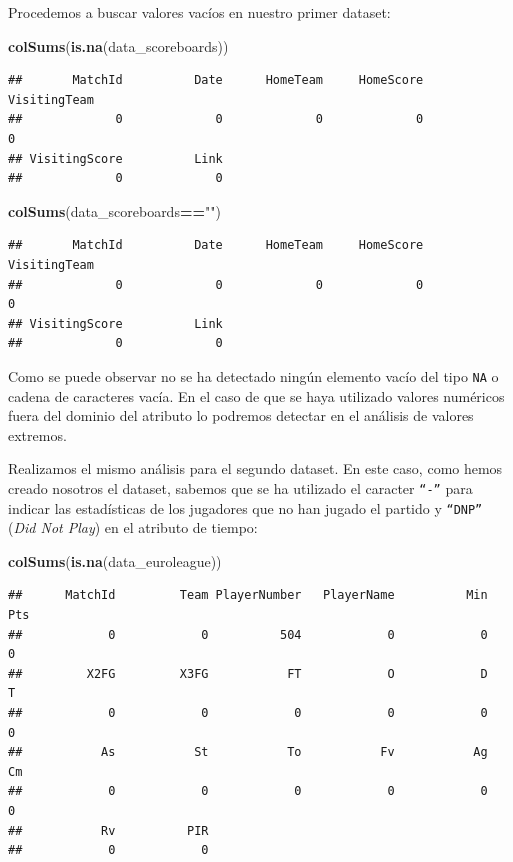 \documentclass[
]{article}
\newenvironment{Shaded}{\begin{snugshade}}{\end{snugshade}}
\newcommand{\KeywordTok}[1]{\textcolor[rgb]{0.13,0.29,0.53}{\textbf{#1}}}
\newcommand{\NormalTok}[1]{#1}
\newcommand{\OperatorTok}[1]{\textcolor[rgb]{0.81,0.36,0.00}{\textbf{#1}}}
\newcommand{\StringTok}[1]{\textcolor[rgb]{0.31,0.60,0.02}{#1}}
\begin{document}
Procedemos a buscar valores vacíos en nuestro primer dataset:

\begin{Shaded}
\begin{Highlighting}[]
\KeywordTok{colSums}\NormalTok{(}\KeywordTok{is.na}\NormalTok{(data_scoreboards))}
\end{Highlighting}
\end{Shaded}

\begin{verbatim}
##       MatchId          Date      HomeTeam     HomeScore  VisitingTeam 
##             0             0             0             0             0 
## VisitingScore          Link 
##             0             0
\end{verbatim}

\begin{Shaded}
\begin{Highlighting}[]
\KeywordTok{colSums}\NormalTok{(data_scoreboards}\OperatorTok{==}\StringTok{""}\NormalTok{)}
\end{Highlighting}
\end{Shaded}

\begin{verbatim}
##       MatchId          Date      HomeTeam     HomeScore  VisitingTeam 
##             0             0             0             0             0 
## VisitingScore          Link 
##             0             0
\end{verbatim}

Como se puede observar no se ha detectado ningún elemento vacío del tipo
\texttt{NA} o cadena de caracteres vacía. En el caso de que se haya
utilizado valores numéricos fuera del dominio del atributo lo podremos
detectar en el análisis de valores extremos.

\newpage

Realizamos el mismo análisis para el segundo dataset. En este caso, como
hemos creado nosotros el dataset, sabemos que se ha utilizado el
caracter \texttt{“-”} para indicar las estadísticas de los jugadores que
no han jugado el partido y \texttt{“DNP”} (\emph{Did Not Play}) en el
atributo de tiempo:

\begin{Shaded}
\begin{Highlighting}[]
\KeywordTok{colSums}\NormalTok{(}\KeywordTok{is.na}\NormalTok{(data_euroleague))}
\end{Highlighting}
\end{Shaded}

\begin{verbatim}
##      MatchId         Team PlayerNumber   PlayerName          Min          Pts 
##            0            0          504            0            0            0 
##         X2FG         X3FG           FT            O            D            T 
##            0            0            0            0            0            0 
##           As           St           To           Fv           Ag           Cm 
##            0            0            0            0            0            0 
##           Rv          PIR 
##            0            0
\end{verbatim}
\end{document}
